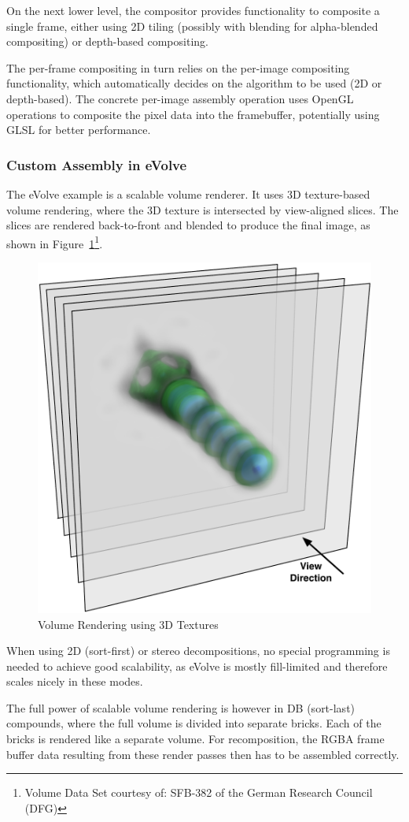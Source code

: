 \documentclass[10pt,a4]{scrartcl}
\newcommand{\fig}[1]{Figure~\ref{#1}}
\begin{document}
On the next lower level, the compositor provides functionality to
composite a single frame, either using 2D tiling (possibly with blending
for alpha-blended compositing) or depth-based compositing. 

The per-frame compositing in turn relies on the per-image compositing
functionality, which automatically decides on the algorithm to be used
(2D or depth-based). The concrete per-image assembly operation uses
OpenGL operations to composite the pixel data into the framebuffer,
potentially using GLSL for better performance.


\subsubsection{Custom Assembly in eVolve}

The \textsf{eVolve} example is a scalable volume renderer. It uses 3D
texture-based volume rendering, where the 3D texture is intersected by
view-aligned slices. The slices are rendered back-to-front and blended
to produce the final image, as shown in \fig{fSlices}\footnote{Volume
  Data Set courtesy of: SFB-382 of the German Research Council (DFG)}.

\begin{figure}
  \includegraphics[width=.382\textwidth]{images/slices.pdf}
  {\caption{\label{fSlices}Volume Rendering using 3D Textures}}
\end{figure}
When using 2D (sort-first) or stereo decompositions, no special
programming is needed to achieve good scalability, as \textsf{eVolve} is
mostly fill-limited and therefore scales nicely in these modes. 

The full power of scalable volume rendering is however in DB (sort-last)
compounds, where the full volume is divided into separate bricks. Each
of the bricks is rendered like a separate volume. For recomposition, the
\textsf{RGBA} frame buffer data resulting from these render passes then
has to be assembled correctly. 
\end{document}
